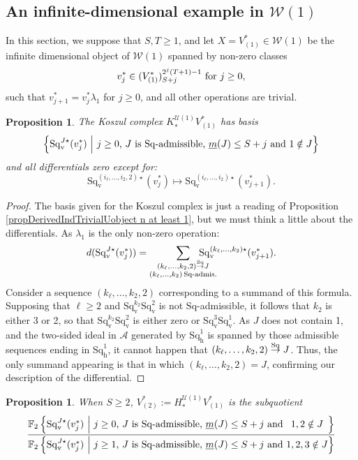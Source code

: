 \documentclass[11pt]{amsart} \renewcommand{\baselinestretch}{1.2}
\theoremstyle{plain}
\newtheorem{prop}[thm]{Proposition}
\numberwithin{equation}{section} %
\theoremstyle{plain}
\newtheorem{prop}[thm]{Proposition}
\numberwithin{equation}{chapter} %
\newcommand{\calU}{\mathcal{U}}
\newcommand{\calA}{\mathcal{A}}
\newcommand{\calw}{\mathcal{W}}
\newcommand{\minDimSq}{\underline{m}}
\newcommand{\produces}[3]{#3:#1\sim #2}
\renewcommand{\produces}[3]{#1\rightarrow_{#3} #2}%
\renewcommand{\produces}[3]{#1\overset{\smash{#3}}{\rightarrow} #2}%
\newcommand{\Sq}{\mathrm{Sq}}
\newcommand{\LieSteen}{\calA}
\newcommand{\F}{\mathbb{F}}
\newcommand{\Ftwo}{\F_2}
\newcommand{\dver}{_\mathrm{v}}
\newcommand{\dhor}{_\mathrm{h}}
\newcommand{\Sqh}{\mathrm{Sq}\dhor}
\newcommand{\Sqv}{\mathrm{Sq}\dver}
\newcommand{\Sqvstar}[1]{\mathrm{Sq}\dver^{#1\star}}
\newcommand{\SubsectionOrSection}[1]{\subsection{#1}}
\begin{document}
\begin{Calculations of HWn}
\SubsectionOrSection{An infinite-dimensional example in $\calw(1)$}
\label{sec: infinite-dimensional example}
In this section, we suppose that $S,T\geq1$, and let $X=V^*_{(1)}\in\calw(1)$ be the infinite dimensional object of $\calw(1)$ spanned by non-zero classes
\[v_{j}^{*}\in (V^*_{(1)})^{2^{j}(T+1)-1}_{S+j}\textup{ for $j\geq 0$},\] such that $v_{j+1}^*=v^*_j\lambda_{1}$ for $j\geq 0$, and all other operations are trivial. %
\begin{prop}
\label{calc of koszul complex in inf dim example}
The Koszul complex $K_*^{\calU(1)}V^*_{(1)}$ has basis
\[\left\{\Sqvstar{J}(v_j^*)\ \middle|\ \textup{$j\geq0$, $J$ is $\Sq$-admissible, $\minDimSq(J)\leq S+j$ and $1\notin J$}\right\} \]
and all differentials zero except for:
\[\Sqvstar{(i_\ell,\ldots,i_2,2)}(v^*_{j})\longmapsto \Sqvstar{(i_\ell,\ldots,i_2)}(v^*_{j+1}).\]
\end{prop}
\begin{proof}
The basis given for the Koszul complex is just a reading of Proposition \ref{propDerivedIndTrivialUobject n at least 1}, but we must think a little about the differentials. As $\lambda_1$ is the only non-zero operation:
\[d(\Sqvstar{J}(v^*_j))=\sum_{ \substack{\produces{(k_{\ell},\ldots,k_2,2)}{J}{\Sq}\\(k_{\ell},\ldots,k_2){\,\Sq\textup{-admis.}}}}\!\!\!\!\!\!\!\!\!\!\!\! \Sqvstar{(k_{\ell},\ldots,k_2)}(v_{j+1}^*).\]
Consider a sequence $(k_\ell,\ldots,k_2,2)$ corresponding to a summand of this formula. Supposing that $\ell\geq2$ and $\Sqv^{k_2}\Sqv^2$ is not $\Sq$-admissible, it follows that $k_2$ is either 3 or 2, so that $\Sqv^{k_2}\Sqv^2$ is either zero or $\Sqv^{3}\Sqv^1$. As $J$ does not contain 1, and the two-sided ideal in $\LieSteen$ generated by $\Sqh^1$ is spanned by those admissible sequences ending in $\Sqh^1$, it cannot happen that $\produces{(k_{\ell},\ldots,k_2,2)}{J}{\Sq}$. Thus, the only summand appearing is that in which $(k_{\ell},\ldots,k_2,2)=J$, confirming our description of the differential.
\end{proof}
\begin{prop}
\label{Sg1 calc of V2}
When $S\geq2$, $V^*_{(2)}:=H_*^{\calU(1)}V^*_{(1)}$ is the subquotient
\[\frac{{\Ftwo\left\{\Sqvstar{J}(v_j^*)\ \middle|\ \makebox[\widthof{$\textup{$j\geq0$}$}][c]{$\textup{$j\geq0$}$}\textup{, $J$ is $\Sq$-admissible, $\minDimSq(J)\leq S+j$ and}\makebox[\widthof{$\textup{ $1,2,3\notin J$}$}][c]{$\textup{ $1,2\notin J$}$}\right\}}}{{\Ftwo\left\{\Sqvstar{J}(v_j^*)\ \middle|\ \makebox[\widthof{$\textup{$j\geq0$}$}][c]{$\textup{$j\geq1$}$}\textup{, $J$ is $\Sq$-admissible, $\minDimSq(J)\leq S+j$ and}\makebox[\widthof{$\textup{ $1,2,3\notin J$}$}][c]{$\textup{ $1,2,3\notin J$}$}\right\}}}\]

\end{prop}
\end{Calculations of HWn}
\end{document}

